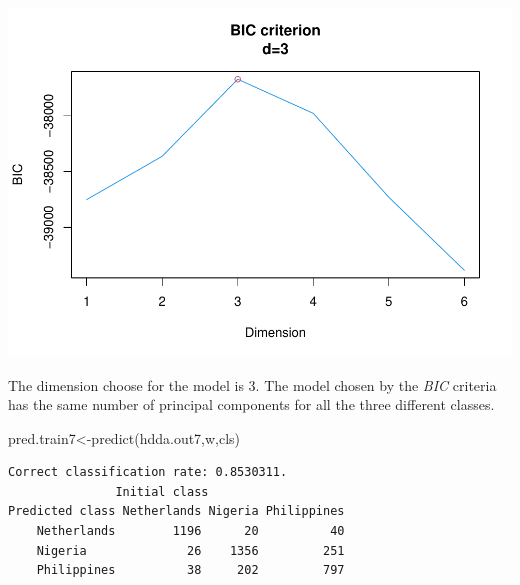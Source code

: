 \documentclass[
  11pt,
]{article}
\newenvironment{Shaded}{\begin{snugshade}}{\end{snugshade}}
\newcommand{\CommentTok}[1]{\textcolor[rgb]{0.56,0.35,0.01}{\textit{#1}}}
\newcommand{\FunctionTok}[1]{\textcolor[rgb]{0.00,0.00,0.00}{#1}}
\newcommand{\NormalTok}[1]{#1}
\newcommand{\OtherTok}[1]{\textcolor[rgb]{0.56,0.35,0.01}{#1}}
\newcommand{\SpecialCharTok}[1]{\textcolor[rgb]{0.00,0.00,0.00}{#1}}
\begin{document}
\includegraphics{1_Task_files/figure-latex/Task_1_12-1.pdf}

The dimension choose for the model is \(3\). The model chosen by the \emph{BIC} criteria has the same number of principal components for all the three different classes.

\begin{Shaded}
\begin{Highlighting}[]
\NormalTok{pred.train7}\OtherTok{\textless{}{-}}\FunctionTok{predict}\NormalTok{(hdda.out7,w,cls)}
\end{Highlighting}
\end{Shaded}

\begin{verbatim}
Correct classification rate: 0.8530311.
               Initial class
Predicted class Netherlands Nigeria Philippines
    Netherlands        1196      20          40
    Nigeria              26    1356         251
    Philippines          38     202         797
\end{verbatim}

\begin{Shaded}
\end{Shaded}
\end{document}

